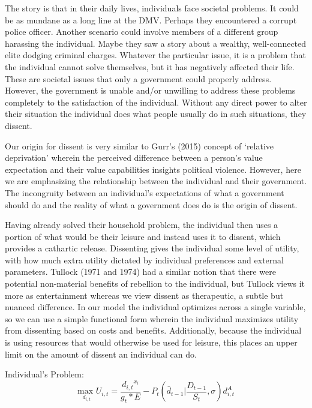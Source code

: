\documentclass[12pt]{article}
\begin{document}
\begin{spacing}{1.5}
The story is that in their daily lives, individuals face societal problems. It could be as mundane as a long line at the DMV. Perhaps they encountered a corrupt police officer. Another scenario could involve members of a different group harassing the individual. Maybe they saw a story about a wealthy, well-connected elite dodging criminal charges. Whatever the particular issue, it is a problem that the individual cannot solve themselves, but it has negatively affected their life. These are societal issues that only a government could properly address. However, the government is unable and/or unwilling to address these problems completely to the satisfaction of the individual. Without any direct power to alter their situation the individual does what people usually do in such situations, they dissent. 

Our origin for dissent is very similar to Gurr's (2015) concept of `relative deprivation' wherein the perceived difference between a person's value expectation and their value capabilities insights political violence. However, here we are emphasizing the relationship between the individual and their government. The incongruity between an individual's expectations of what a government should do and the reality of what a government does do is the origin of dissent.

Having already solved their household problem, the individual then uses a portion of what would be their leisure and instead uses it to dissent, which provides a cathartic release. Dissenting gives the individual some level of utility, with how much extra utility dictated by individual preferences and external parameters. Tullock (1971 and 1974) had a similar notion that there were potential non-material benefits of rebellion to the individual, but Tullock views it more as entertainment whereas we view dissent as therapeutic, a subtle but nuanced difference. In our model the individual optimizes across a single variable, so we can use a simple functional form wherein the individual maximizes utility from dissenting based on costs and benefits. Additionally, because the individual is using resources that would otherwise be used for leisure, this places an upper limit on the amount of dissent an individual can do. 

\vspace{.5 em}
\noindent Individual's Problem:
\begin{equation}
{\underset{d_{i,t}}{\text{max }}}  U_{i,t}= \frac{{d_{i,t}}^{{x}_i}}{g_t * E} - P_t \left( \bar{d}_{t-1} \Bigg|\frac{D_{t-1}}{S_t},\sigma \right)d_{i,t}^A
\end{equation}


\end{spacing}
\end{document}
